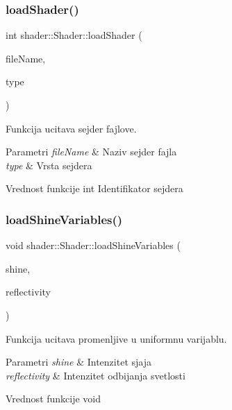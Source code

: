 \subsubsection{\texorpdfstring{load\+Shader()}{loadShader()}}
{\footnotesize\ttfamily int shader\+::\+Shader\+::load\+Shader (\begin{DoxyParamCaption}\item[{const char $\ast$}]{file\+Name,  }\item[{G\+Lenum}]{type }\end{DoxyParamCaption})\hspace{0.3cm}{\ttfamily [private]}}



Funkcija ucitava sejder fajlove. 


\begin{DoxyParams}{Parametri}
{\em file\+Name} & Naziv sejder fajla \\
\hline
{\em type} & Vrsta sejdera \\
\hline
\end{DoxyParams}
\begin{DoxyReturn}{Vrednost funkcije}
int Identifikator sejdera 
\end{DoxyReturn}
\mbox{\label{classshader_1_1Shader_acd4755a3b83ebb6b0577832609cc520f}} 
\subsubsection{\texorpdfstring{load\+Shine\+Variables()}{loadShineVariables()}}
{\footnotesize\ttfamily void shader\+::\+Shader\+::load\+Shine\+Variables (\begin{DoxyParamCaption}\item[{float}]{shine,  }\item[{float}]{reflectivity }\end{DoxyParamCaption})}



Funkcija ucitava promenljive u uniformnu varijablu. 


\begin{DoxyParams}{Parametri}
{\em shine} & Intenzitet sjaja \\
\hline
{\em reflectivity} & Intenzitet odbijanja svetlosti \\
\hline
\end{DoxyParams}
\begin{DoxyReturn}{Vrednost funkcije}
void 
\end{DoxyReturn}
\mbox{\label{classshader_1_1Shader_ace9f5d9ac79e04082aafa33c22d9f96c}} 
